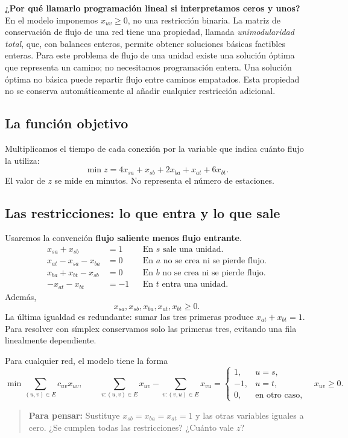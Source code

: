 \documentclass[11pt,letterpaper]{article}
\newcommand{\pregunta}[1]{\begin{quote}\color{verde}\textbf{Para pensar:} #1\end{quote}}
\begin{document}
\textbf{¿Por qué llamarlo programación lineal si interpretamos ceros y unos?} En el modelo imponemos $x_{uv}\geq0$, no una restricción binaria. La matriz de conservación de flujo de una red tiene una propiedad, llamada \emph{unimodularidad total}, que, con balances enteros, permite obtener soluciones básicas factibles enteras. Para este problema de flujo de una unidad existe una solución óptima que representa un camino; no necesitamos programación entera. Una solución óptima no básica puede repartir flujo entre caminos empatados. Esta propiedad no se conserva automáticamente al añadir cualquier restricción adicional.

\subsection{La función objetivo}
Multiplicamos el tiempo de cada conexión por la variable que indica cuánto flujo la utiliza:
\[
\boxed{\min z=4x_{sa}+x_{sb}+2x_{ba}+x_{at}+6x_{bt}.}
\]
El valor de $z$ se mide en minutos. No representa el número de estaciones.

\subsection{Las restricciones: lo que entra y lo que sale}
Usaremos la convención \textbf{flujo saliente menos flujo entrante}.
\begin{align}
x_{sa}+x_{sb}&=1 &&\text{En $s$ sale una unidad.}\label{eq:s}\\
x_{at}-x_{sa}-x_{ba}&=0 &&\text{En $a$ no se crea ni se pierde flujo.}\label{eq:a}\\
x_{ba}+x_{bt}-x_{sb}&=0 &&\text{En $b$ no se crea ni se pierde flujo.}\label{eq:b}\\
-x_{at}-x_{bt}&=-1 &&\text{En $t$ entra una unidad.}\label{eq:t}
\end{align}
Además,
\[
x_{sa},x_{sb},x_{ba},x_{at},x_{bt}\geq0.
\]
La última igualdad es redundante: sumar las tres primeras produce $x_{at}+x_{bt}=1$. Para resolver con símplex conservamos solo las primeras tres, evitando una fila linealmente dependiente.

Para cualquier red, el modelo tiene la forma
\[
\min\sum_{(u,v)\in E}c_{uv}x_{uv},\qquad
\sum_{v:(u,v)\in E}x_{uv}-\sum_{v:(v,u)\in E}x_{vu}
=\begin{cases}1,&u=s,\\-1,&u=t,\\0,&\text{en otro caso},\end{cases}
\quad x_{uv}\geq0.
\]
\pregunta{Sustituye $x_{sb}=x_{ba}=x_{at}=1$ y las otras variables iguales a cero. ¿Se cumplen todas las restricciones? ¿Cuánto vale $z$?}
\end{document}
